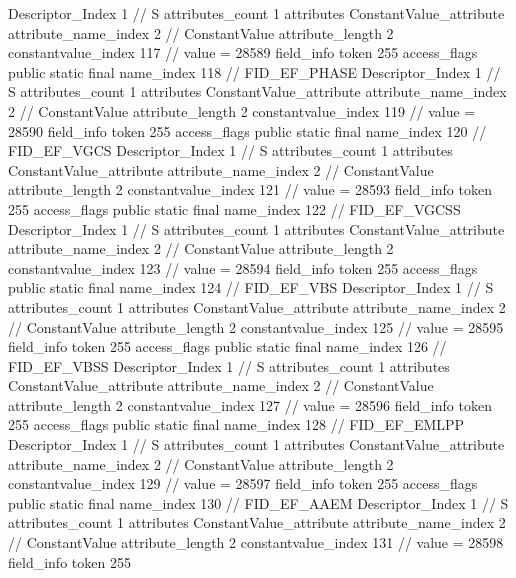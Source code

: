 {{{{{				Descriptor_Index	1		// S
				attributes_count	1
				attributes {
				ConstantValue_attribute {
					attribute_name_index	2		// ConstantValue
					attribute_length	2
					constantvalue_index	117		// value = 28589
				}
				}
			}
			field_info {
				token	255
				access_flags	public static final
				name_index	118		// FID_EF_PHASE
				Descriptor_Index	1		// S
				attributes_count	1
				attributes {
				ConstantValue_attribute {
					attribute_name_index	2		// ConstantValue
					attribute_length	2
					constantvalue_index	119		// value = 28590
				}
				}
			}
			field_info {
				token	255
				access_flags	public static final
				name_index	120		// FID_EF_VGCS
				Descriptor_Index	1		// S
				attributes_count	1
				attributes {
				ConstantValue_attribute {
					attribute_name_index	2		// ConstantValue
					attribute_length	2
					constantvalue_index	121		// value = 28593
				}
				}
			}
			field_info {
				token	255
				access_flags	public static final
				name_index	122		// FID_EF_VGCSS
				Descriptor_Index	1		// S
				attributes_count	1
				attributes {
				ConstantValue_attribute {
					attribute_name_index	2		// ConstantValue
					attribute_length	2
					constantvalue_index	123		// value = 28594
				}
				}
			}
			field_info {
				token	255
				access_flags	public static final
				name_index	124		// FID_EF_VBS
				Descriptor_Index	1		// S
				attributes_count	1
				attributes {
				ConstantValue_attribute {
					attribute_name_index	2		// ConstantValue
					attribute_length	2
					constantvalue_index	125		// value = 28595
				}
				}
			}
			field_info {
				token	255
				access_flags	public static final
				name_index	126		// FID_EF_VBSS
				Descriptor_Index	1		// S
				attributes_count	1
				attributes {
				ConstantValue_attribute {
					attribute_name_index	2		// ConstantValue
					attribute_length	2
					constantvalue_index	127		// value = 28596
				}
				}
			}
			field_info {
				token	255
				access_flags	public static final
				name_index	128		// FID_EF_EMLPP
				Descriptor_Index	1		// S
				attributes_count	1
				attributes {
				ConstantValue_attribute {
					attribute_name_index	2		// ConstantValue
					attribute_length	2
					constantvalue_index	129		// value = 28597
				}
				}
			}
			field_info {
				token	255
				access_flags	public static final
				name_index	130		// FID_EF_AAEM
				Descriptor_Index	1		// S
				attributes_count	1
				attributes {
				ConstantValue_attribute {
					attribute_name_index	2		// ConstantValue
					attribute_length	2
					constantvalue_index	131		// value = 28598
				}
				}
			}
			field_info {
				token	255
}}}}}
